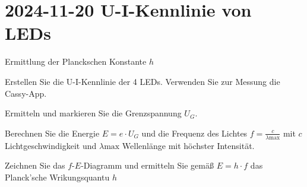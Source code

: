 \section{2024-11-20 U-I-Kennlinie von LEDs}

Ermittlung der Planckschen Konstante $h$

Erstellen Sie die U-I-Kennlinie der 4 LEDs. Verwenden Sie zur Messung die
Cassy-App.

Ermitteln und markieren Sie die Grenzspannung $U_G$.

Berechnen Sie die Energie $E=e\cdot U_G$ und die Frequenz des Lichtes
$f=\frac{c}{\lambda \text{max}}$ mit $c$ Lichtgeschwindigkeit und
$\lambda \text{max}$ Wellenlänge mit höchster Intensität.

Zeichnen Sie das $f$-$E$-Diagramm und ermitteln Sie gemäß $E=h\cdot f$ das
Planck'sche Wrikungsquantu $h$

%
%
%
%
